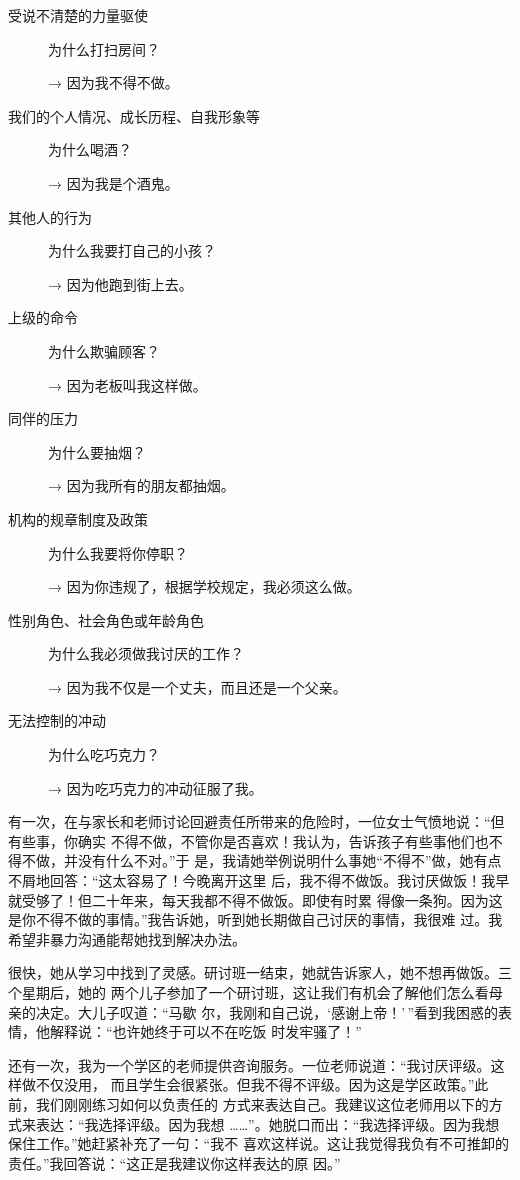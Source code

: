 \documentclass{ctexart}
\begin{document}
\begin{description}
	\item[受说不清楚的力量驱使] 为什么打扫房间？

		→ 因为我不得不做。
	\item[我们的个人情况、成长历程、自我形象等] 为什么喝酒？

		→ 因为我是个酒鬼。
	\item[其他人的行为] 为什么我要打自己的小孩？

		→ 因为他跑到街上去。
	\item[上级的命令] 为什么欺骗顾客？

		→ 因为老板叫我这样做。
	\item[同伴的压力] 为什么要抽烟？

		→ 因为我所有的朋友都抽烟。
	\item[机构的规章制度及政策] 为什么我要将你停职？

		→ 因为你违规了，根据学校规定，我必须这么做。
	\item[性别角色、社会角色或年龄角色] 为什么我必须做我讨厌的工作？

		→ 因为我不仅是一个丈夫，而且还是一个父亲。
	\item[无法控制的冲动] 为什么吃巧克力？

		→ 因为吃巧克力的冲动征服了我。
\end{description}


有一次，在与家长和老师讨论回避责任所带来的危险时，一位女士气愤地说：``但有些事，你确实
不得不做，不管你是否喜欢！我认为，告诉孩子有些事他们也不得不做，并没有什么不对。''于
是，我请她举例说明什么事她``不得不''做，她有点不屑地回答：``这太容易了！今晚离开这里
后，我不得不做饭。我讨厌做饭！我早就受够了！但二十年来，每天我都不得不做饭。即使有时累
得像一条狗。因为这是你不得不做的事情。''我告诉她，听到她长期做自己讨厌的事情，我很难
过。我希望非暴力沟通能帮她找到解决办法。

很快，她从学习中找到了灵感。研讨班一结束，她就告诉家人，她不想再做饭。三个星期后，她的
两个儿子参加了一个研讨班，这让我们有机会了解他们怎么看母亲的决定。大儿子叹道：``马歇
尔，我刚和自己说，`感谢上帝！'\,''看到我困惑的表情，他解释说：``也许她终于可以不在吃饭
时发牢骚了！''

还有一次，我为一个学区的老师提供咨询服务。一位老师说道：``我讨厌评级。这样做不仅没用，
而且学生会很紧张。但我不得不评级。因为这是学区政策。''此前，我们刚刚练习如何以负责任的
方式来表达自己。我建议这位老师用以下的方式来表达：``我选择评级。因为我想
\ldots\ldots''。她脱口而出：``我选择评级。因为我想保住工作。''她赶紧补充了一句：``我不
喜欢这样说。这让我觉得我负有不可推卸的责任。''我回答说：``这正是我建议你这样表达的原
因。''
\end{document}
